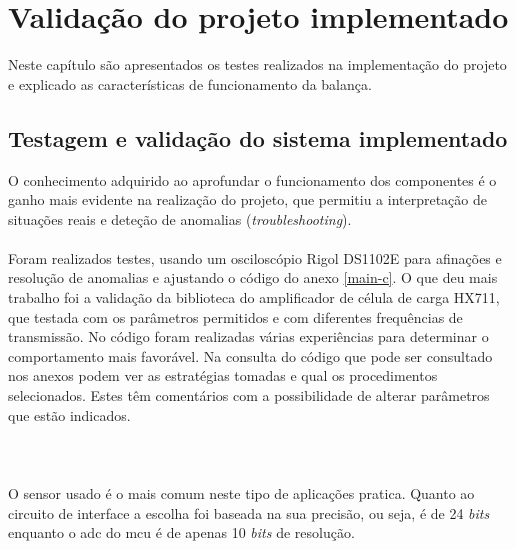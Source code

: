 \chapter{Validação do projeto implementado}
Neste capítulo são apresentados os testes realizados na implementação do projeto e explicado as características de funcionamento da balança.
\section{Testagem e validação do sistema implementado}
O conhecimento adquirido ao aprofundar o funcionamento dos componentes é o ganho mais evidente na realização do projeto, que permitiu a interpretação de situações reais e deteção de anomalias (\textit{troubleshooting}).
\\
\\
Foram realizados testes, usando um osciloscópio Rigol DS1102E para afinações e resolução de anomalias e ajustando o código do anexo \ref{main-c}. O que deu mais trabalho foi a validação da biblioteca do amplificador de célula de carga HX711, que testada com os parâmetros permitidos e com diferentes frequências de transmissão. No código foram realizadas várias experiências para determinar o comportamento mais favorável. Na consulta do código que pode ser consultado nos anexos podem ver as estratégias tomadas e qual os procedimentos selecionados. Estes têm comentários com a possibilidade de alterar parâmetros que estão indicados.
\\
\\
\\
\\
O sensor usado é o mais comum neste tipo de aplicações pratica. Quanto ao circuito de interface a escolha foi baseada na sua precisão, ou seja, é de 24 \textit{bits} enquanto o \acs{adc} do \acs{mcu} é de apenas 10 \textit{bits} de resolução.
